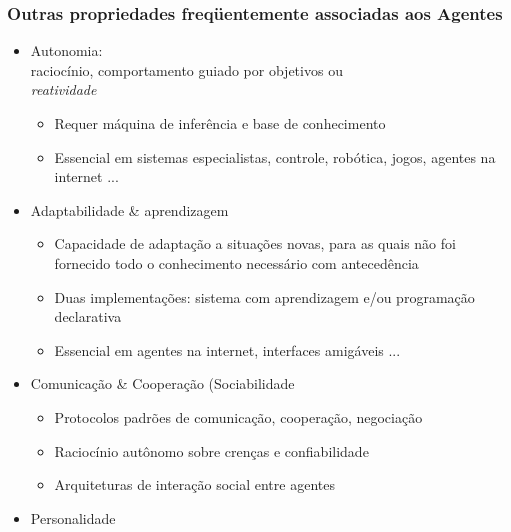 \begin{frame} [allowframebreaks=0.9]

    \frametitle{Outras propriedades freqüentemente associadas aos Agentes}

 
    \begin{itemize}
      \item Autonomia:\\
raciocínio, comportamento guiado por objetivos ou \\
\textit{reatividade}

\begin{itemize}
  \item Requer máquina de inferência e base de conhecimento
  \item Essencial em sistemas especialistas, controle, robótica, jogos, agentes na internet ...
\end{itemize}
      
    \item Adaptabilidade \& aprendizagem
             
    \begin{itemize}
             
    \item Capacidade de adaptação a situações novas, para as quais não foi fornecido todo o      conhecimento necessário com antecedência 

     \item Duas implementações: sistema com  
           aprendizagem 
           e/ou programação declarativa
  
     \item Essencial em agentes na internet, interfaces amigáveis ...
   
    \end{itemize}
             
             
    \item Comunicação \& Cooperação (Sociabilidade
         \begin{itemize}
          \item  Protocolos padrões de comunicação, cooperação, negociação
          \item  Raciocínio autônomo sobre crenças e confiabilidade
          \item   Arquiteturas de interação social entre agentes
                      
         \end{itemize}
         
                
    \item Personalidade
    

\end{itemize}
\end{frame}
